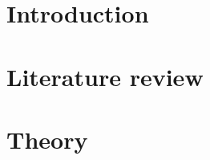 























%








\maketitle

\thispagestyle{empty}

\clearpage

\pagestyle{scrheadings}

\small {
}
\clearpage
\normalsize

\section{Introduction}


\section{Literature review}


\section{Theory}


